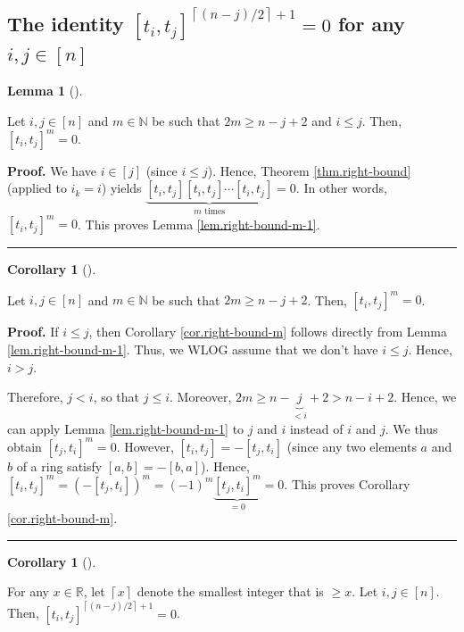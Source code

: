 \documentclass[numbers=enddot,12pt,final,onecolumn,notitlepage]{scrartcl}%
\theoremstyle{definition}
\newtheorem{lem}[theo]{Lemma}
\newenvironment{lemma}[1][]
{\begin{lem}[#1]\begin{leftbar}}
{\end{leftbar}\end{lem}}
\newtheorem{coro}[theo]{Corollary}
\newenvironment{corollary}[1][]
{\begin{coro}[#1]\begin{leftbar}}
{\end{leftbar}\end{coro}}
\newenvironment{proof}[1][Proof]{\noindent\textbf{#1.} }{\ \rule{0.5em}{0.5em}}
\begin{document}
\subsection{The identity $\left[  t_{i},t_{j}\right]  ^{\left\lceil \left(
n-j\right)  /2\right\rceil +1}=0$ for any $i,j\in\left[  n\right]  $}

\begin{lemma}
\label{lem.right-bound-m-1}Let $i,j\in\left[  n\right]  $ and $m\in\mathbb{N}$
be such that $2m\geq n-j+2$ and $i\leq j$. Then, $\left[  t_{i},t_{j}\right]
^{m}=0$.
\end{lemma}

\begin{proof}
We have $i\in\left[  j\right]  $ (since $i\leq j$). Hence, Theorem
\ref{thm.right-bound} (applied to $i_{k}=i$) yields $\underbrace{\left[
t_{i},t_{j}\right]  \left[  t_{i},t_{j}\right]  \cdots\left[  t_{i}%
,t_{j}\right]  }_{m\text{ times}}=0$. In other words, $\left[  t_{i}%
,t_{j}\right]  ^{m}=0$. This proves Lemma \ref{lem.right-bound-m-1}.
\end{proof}

\begin{corollary}
\label{cor.right-bound-m}Let $i,j\in\left[  n\right]  $ and $m\in\mathbb{N}$
be such that $2m\geq n-j+2$. Then, $\left[  t_{i},t_{j}\right]  ^{m}=0$.
\end{corollary}

\begin{proof}
If $i\leq j$, then Corollary \ref{cor.right-bound-m} follows directly from
Lemma \ref{lem.right-bound-m-1}. Thus, we WLOG assume that we don't have
$i\leq j$. Hence, $i>j$.

Therefore, $j<i$, so that $j\leq i$. Moreover, $2m\geq n-\underbrace{j}%
_{<i}+2>n-i+2$. Hence, we can apply Lemma \ref{lem.right-bound-m-1} to $j$ and
$i$ instead of $i$ and $j$. We thus obtain $\left[  t_{j},t_{i}\right]
^{m}=0$. However, $\left[  t_{i},t_{j}\right]  =-\left[  t_{j},t_{i}\right]  $
(since any two elements $a$ and $b$ of a ring satisfy $\left[  a,b\right]
=-\left[  b,a\right]  $). Hence, $\left[  t_{i},t_{j}\right]  ^{m}=\left(
-\left[  t_{j},t_{i}\right]  \right)  ^{m}=\left(  -1\right)  ^{m}%
\underbrace{\left[  t_{j},t_{i}\right]  ^{m}}_{=0}=0$. This proves Corollary
\ref{cor.right-bound-m}.
\end{proof}

\begin{corollary}
\label{cor.right-bound}For any $x\in\mathbb{R}$, let $\left\lceil
x\right\rceil $ denote the smallest integer that is $\geq x$. Let
$i,j\in\left[  n\right]  $. Then, $\left[  t_{i},t_{j}\right]  ^{\left\lceil
\left(  n-j\right)  /2\right\rceil +1}=0$.
\end{corollary}
\end{document}
